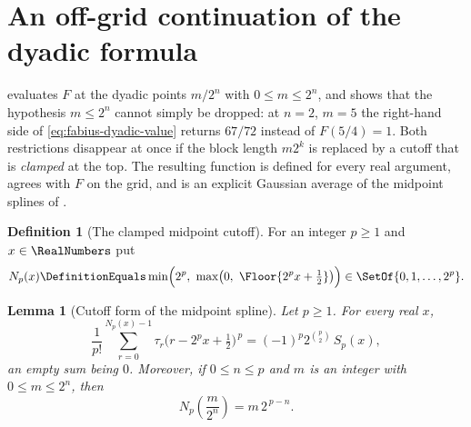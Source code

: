 \documentclass[11pt,a4paper,oneside,openany]{book}
\newtheorem{lemma}[lemma]{Lemma}
\theoremstyle{definition}
\newtheorem{definition}[definition]{Definition}
\theoremstyle{remark}
\begin{document}
\section{An off-grid continuation of the dyadic formula}

 evaluates $F$ at the dyadic points
$m/2^n$ with $0\le m\le2^n$, and  shows that
the hypothesis $m\le2^n$ cannot simply be dropped: at $n=2$, $m=5$ the right-hand
side of \eqref{eq:fabius-dyadic-value} returns $67/72$ instead of $F(5/4)=1$.
Both restrictions disappear at once if the block length $m2^k$ is replaced by a
cutoff that is \emph{clamped} at the top.  The resulting function is defined for
every real argument, agrees with $F$ on the grid, and is an explicit Gaussian
average of the midpoint splines of .

\begin{definition}[The clamped midpoint cutoff]\label{def:clamped-cutoff}
For an integer $p\ge1$ and $x\in\RealNumbers$ put
\begin{equation}\label{eq:clamped-cutoff}
 N_p(x)\DefinitionEquals\min\Bigl(2^p,\ \max\bigl(0,\ \Floor{2^px+\tfrac12}\bigr)\Bigr)
 \in\SetOf{0,1,\ldots,2^p} .
\end{equation}
\end{definition}

\begin{lemma}[Cutoff form of the midpoint spline]\label{lem:cutoff-to-spline}
Let $p\ge1$.  For every real $x$,
\begin{equation}\label{eq:cutoff-to-spline}
 \frac1{p!}\sum_{r=0}^{N_p(x)-1}\tau_r\bigl(r-2^px+\tfrac12\bigr)^{\,p}
 =(-1)^p2^{\binom p2}\,S_p(x),
\end{equation}
an empty sum being $0$.  Moreover, if $0\le n\le p$ and $m$ is an integer with
$0\le m\le2^n$, then
\begin{equation}\label{eq:clamped-cutoff-on-grid}
 N_p\!\left(\frac m{2^n}\right)=m\,2^{\,p-n}.
\end{equation}
\end{lemma}
\end{document}
